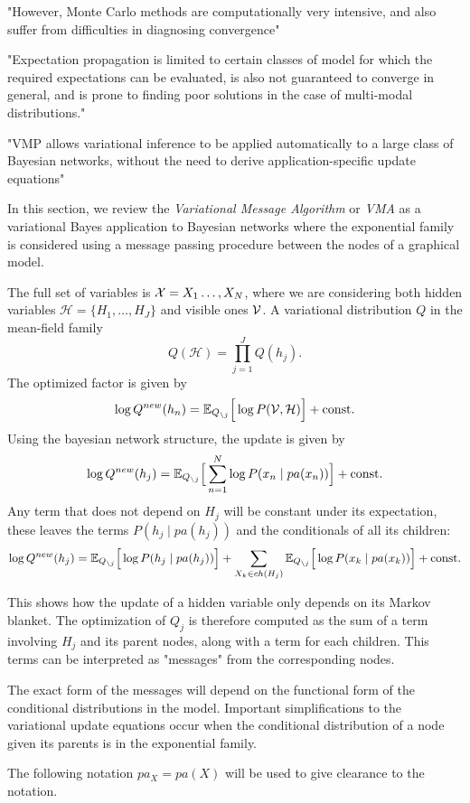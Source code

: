 
"However, Monte Carlo methods are computationally very intensive, and also suffer from difficulties in diagnosing convergence"

"Expectation propagation is limited to certain classes of model for which the required expectations can be evaluated, is also not guaranteed to converge in general, and is prone to finding poor solutions in the case of multi-modal distributions."

"VMP allows variational inference to be applied automatically to a large class of Bayesian networks, without the need to derive application-specific update equations"

In this section, we review the \emph{Variational Message Algorithm} or \emph{VMA} as a variational Bayes application to Bayesian networks where the exponential family is considered using a message passing procedure between the nodes of a graphical model. 

The full set of variables is \( \mathcal{X} = X_1\dots,X_N \), where we are considering both hidden variables \( \mathcal{H} = \{H_1,\dots,H_J\} \) and visible ones \( \mathcal{V} \). A variational distribution \( Q \) in the mean-field family
\[
   Q(\mathcal{H}) = \prod_{j=1}^J Q(h_j).
\] 
The optimized factor is given by 
\[
   \log Q^{new}(h_n) = \mathbb{E}_{Q_{\backslash j}}\Big[\log P(\mathcal{V}, \mathcal{H})\Big] + \text{const.}
\]
Using the bayesian network structure, the update is given by 
\[
  \log Q^{new}(h_j) = \mathbb{E}_{Q_{\backslash j}}\Big[ \sum_{n=1}^N \log P(x_n \mid pa(x_n))\Big] + \text{const.}
\]
Any term that does not depend on \( H_j \) will be constant under its expectation, these leaves the terms \( P(h_j \mid pa(h_j)) \) and the conditionals of all its children:
\[
   \log Q^{new}(h_j) = \mathbb{E}_{Q_{\backslash j}}\Big[\log P(h_j \mid pa(h_j))\Big] + \sum_{X_k \in ch(H_j)} \mathbb{E}_{Q_{\backslash j}}\Big[\log P(x_k \mid pa(x_k))\Big] + \text{const.}
\]

This shows how the update of a hidden variable only depends on its Markov blanket. The optimization of \( Q_j \) is therefore computed as the sum of a term involving \( H_j \) and its parent nodes, along with a term for each children. This terms can be interpreted as "messages" from the corresponding nodes.

The exact form of the messages will depend on the functional form of the conditional distributions in the model. Important simplifications to the variational update equations occur when the conditional distribution of a node given its parents is in the exponential family. 

The following notation \( pa_X = pa(X) \) will be used to give clearance to the notation.

